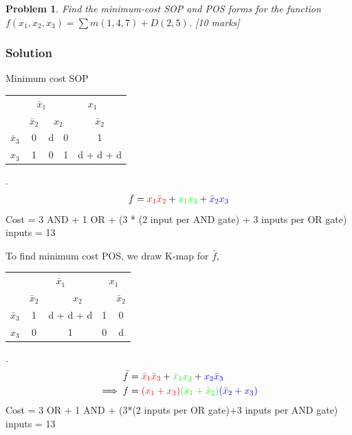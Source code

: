 \documentclass[twocolumn]{article}
\newtheorem{prob}{Problem}
\newcommand{\bx}{\bar{x}}
\newcommand{\cred}{\color{red}}
\newcommand{\cg}{\color{green}}
\newcommand{\cb}{\color{blue}}
\begin{document}
\begin{prob}
Find the minimum-cost SOP and POS forms for the function $f(x_1 , x_2 , x_3) =
\sum m(1, 4, 7) + D(2, 5)$. \cite[Prob 2.38]{brown2013fundamentals} [10 marks]
\end{prob}

\subsubsection*{Solution}

Minimum cost SOP
\\
\begin{tabular}{c|c|c|c|c}
  \toprule
  & \multicolumn{2}{c|}{$\bx_1$} & \multicolumn{2}{c}{$x_1$}
  \\
  & $\bx_2$ & \multicolumn{2}{c|}{$x_2$} & $\bx_2$
  \\ \midrule
  $\bx_3$
                                  & 0 & d & 0 & \cred 1
  \\
  $x_3$
                                  & \cb 1 & 0 & {\cg 1} & {\cg d} + \cred d + \cb d
  \\\bottomrule
\end{tabular}.
\\
\begin{align}
  f = {\cred x_1 \bx_2} + {\cg x_1 x_3} + {\cb \bx_2 x_3}
\end{align}
Cost = 3 AND  + 1 OR + (3 * (2 input per AND gate) + 3 inputs per OR gate) inputs = 13

To find minimum cost POS, we draw K-map for $\bar{f}$,
\\
\begin{tabular}{c|c|c|c|c}
  \toprule
  & \multicolumn{2}{c|}{$\bx_1$} & \multicolumn{2}{c}{$x_1$}
  \\
  & $\bx_2$ & \multicolumn{2}{c|}{$x_2$} & $\bx_2$
  \\ \midrule
  $\bx_3$
  & \cred 1 & \cred d  + \cg d + \cb d & \cb 1 & 0
  \\
  $x_3$
  & 0 & \cg 1 & 0 & d
  \\\bottomrule
\end{tabular}.
\\
\begin{align}
  \bar{f} &= {\cred \bx_1 \bx_3 } + {\cg \bx_1 x_2 } + {\cb x_2 \bx_3}
  \\
  \implies f &= {\cred (x_1 + x_3)}{\cg (x_1 + \bx_2) } {\cb (\bx_2 + x_3)}
\end{align}
Cost = 3 OR + 1 AND + (3*(2 inputs per OR gate)+3 inputs per AND gate) inputs = 13
\end{document}
